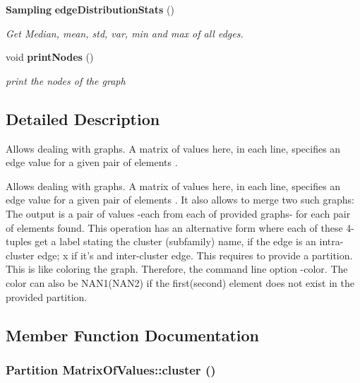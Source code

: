\begin{CompactItemize}
\item 
{\bf Sampling} {\bf edge\-Distribution\-Stats} ()
\begin{CompactList}\small\item\em Get Median, mean, std, var, min and max of all edges. \item\end{CompactList}\item 
void {\bf print\-Nodes} ()\label{classMatrixOfValues_a30}

\begin{CompactList}\small\item\em print the nodes of the graph \item\end{CompactList}\end{CompactItemize}


\subsection{Detailed Description}
Allows dealing with graphs. A matrix of values here, in each line, specifies an edge value for a given pair of elements . 

Allows dealing with graphs. A matrix of values here, in each line, specifies an edge value for a given pair of elements . It also allows to merge two such graphs: The output is a pair of values -each from each of provided graphs- for each pair of elements found. This operation has an alternative form where each of these 4-tuples get a label stating the cluster (subfamily) name, if the edge is an intra-cluster edge; x if it's and inter-cluster edge. This requires to provide a partition. This is like coloring the graph. Therefore, the command line option -color. The color can also be NAN1(NAN2) if the first(second) element does not exist in the provided partition. 



\subsection{Member Function Documentation}
\subsubsection{\setlength{\rightskip}{0pt plus 5cm}Partition Matrix\-Of\-Values::cluster ()}\label{classMatrixOfValues_a9}


